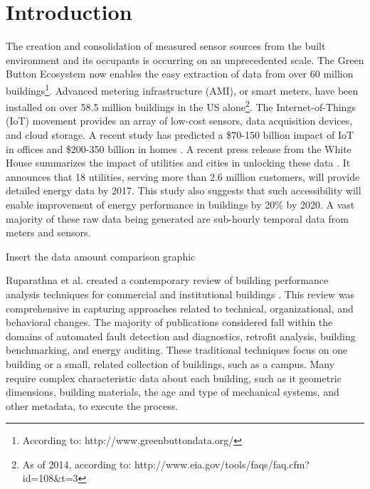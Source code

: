 \section{Introduction}

The creation and consolidation of measured sensor sources from the built environment and its occupants is occurring on an unprecedented scale. The Green Button Ecosystem now enables the easy extraction of data from over 60 million buildings\footnote{According to: http://www.greenbuttondata.org/}. Advanced metering infrastructure (AMI), or smart meters, have been installed on over 58.5 million buildings in the US alone\footnote{As of 2014, according to: http://www.eia.gov/tools/faqs/faq.cfm?id=108&t=3}. The Internet-of-Things (IoT) movement provides an array of low-cost sensors, data acquisition devices, and cloud storage. A recent study has predicted a \$70-150 billion impact of IoT in offices and \$200-350 billion in homes \cite{james_manyika_unlocking_2015}. A recent press release from the White House summarizes the impact of utilities and cities in unlocking these data \cite{the_white_house_fact_2016}. It announces that 18 utilities, serving more than 2.6 million customers, will provide detailed energy data by 2017. This study also suggests that such accessibility will enable improvement of energy performance in buildings by 20\% by 2020. A vast majority of these raw data being generated are sub-hourly temporal data from meters and sensors. 

Insert the data amount comparison graphic

Ruparathna et al. created a contemporary review of building performance analysis techniques for commercial and institutional buildings \cite{ruparathna_improving_2016}. This review was comprehensive in capturing approaches related to technical, organizational, and behavioral changes. The majority of publications considered fall within the domains of automated fault detection and diagnostics, retrofit analysis, building benchmarking, and energy auditing. These traditional techniques focus on one building or a small, related collection of buildings, such as a campus. Many require complex characteristic data about each building, such as it geometric dimensions, building materials, the age and type of mechanical systems, and other metadata, to execute the process. 

